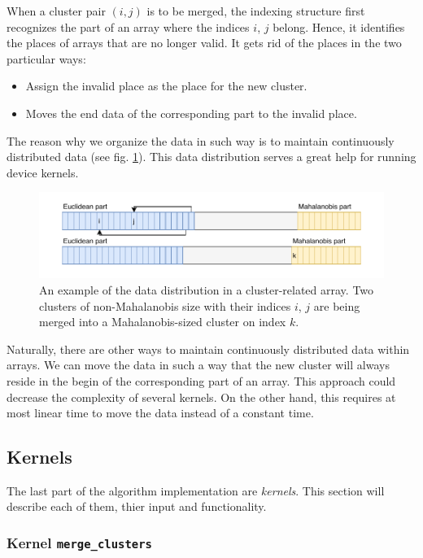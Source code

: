 When a cluster pair $(i,j)$ is to be merged, the indexing structure first recognizes the part of an array where the indices $i$, $j$ belong. Hence, it identifies the places of arrays that are no longer valid. It gets rid of the places in the two particular ways:
\begin{itemize}
	\item Assign the invalid place as the place for the new cluster.
	\item Moves the end data of the corresponding part to the invalid place.
\end{itemize}
The reason why we organize the data in such way is to maintain continuously distributed data (see fig. \ref{fig03:data_order}). This data distribution serves a great help for running device kernels.

\begin{figure}\centering
	\includegraphics[width=\textwidth]{img/data}
	\caption{An example of the data distribution in a cluster-related array. Two clusters of non-Mahalanobis size with their indices $i$, $j$ are being merged into a Mahalanobis-sized cluster on index $k$.}
	\label{fig03:data_order}
\end{figure}

\begin{rem}
	Naturally, there are other ways to maintain continuously distributed data within arrays. We can move the data in such a way that the new cluster will always reside in the begin of the corresponding part of an array. This approach could decrease the complexity of several kernels. On the other hand, this requires at most linear time to move the data instead of a constant time.
\end{rem}

\subsection{Kernels}

The last part of the algorithm implementation are \emph{kernels}. This section will describe each of them, thier input and functionality.

\subsubsection{Kernel \texttt{merge\_clusters}}

